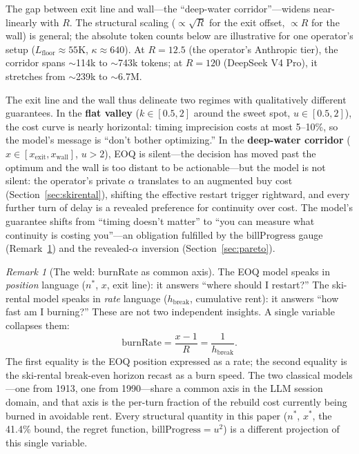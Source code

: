\documentclass[11pt]{article}
\theoremstyle{definition}
\theoremstyle{remark}
\newtheorem{remark}[theorem]{Remark}
\begin{document}
The gap between exit line and wall---the ``deep-water corridor''---widens near-linearly with $R$. The structural scaling ($\propto\sqrt{R}$ for the exit offset, $\propto R$ for the wall) is general; the absolute token counts below are illustrative for one operator's setup ($L_{\text{floor}} \approx 55$K, $\kappa \approx 640$). At $R = 12.5$ (the operator's Anthropic tier), the corridor spans $\sim$114k to $\sim$743k tokens; at $R = 120$ (DeepSeek V4 Pro), it stretches from $\sim$239k to $\sim$6.7M.

The exit line and the wall thus delineate two regimes with qualitatively different guarantees. In the \textbf{flat valley} ($k \in [0.5, 2]$ around the sweet spot, $u \in [0.5, 2]$), the cost curve is nearly horizontal: timing imprecision costs at most 5--10\%, so the model's message is ``don't bother optimizing.'' In the \textbf{deep-water corridor} ($x \in [x_{\text{exit}}, x_{\text{wall}}]$, $u > 2$), EOQ is silent---the decision has moved past the optimum and the wall is too distant to be actionable---but the model is not silent: the operator's private $\alpha$ translates to an augmented buy cost (Section~\ref{sec:skirental}), shifting the effective restart trigger rightward, and every further turn of delay is a revealed preference for continuity over cost. The model's guarantee shifts from ``timing doesn't matter'' to ``you can measure what continuity is costing you''---an obligation fulfilled by the $\text{billProgress}$ gauge (Remark~\ref{rem:weld}) and the revealed-$\alpha$ inversion (Section~\ref{sec:pareto}).

\begin{remark}[The weld: burnRate as common axis]
\label{rem:weld}
The EOQ model speaks in \emph{position} language ($n^*$, $x$, exit line): it answers ``where should I restart?'' The ski-rental model speaks in \emph{rate} language ($h_{\text{break}}$, cumulative rent): it answers ``how fast am I burning?'' These are not two independent insights. A single variable collapses them:
\[
\text{burnRate} = \frac{x-1}{R} = \frac{1}{h_{\text{break}}}.
\]
The first equality is the EOQ position expressed as a rate; the second equality is the ski-rental break-even horizon recast as a burn speed. The two classical models---one from 1913, one from 1990---share a common axis in the LLM session domain, and that axis is the per-turn fraction of the rebuild cost currently being burned in avoidable rent. Every structural quantity in this paper ($n^*$, $x^*$, the 41.4\% bound, the regret function, $\text{billProgress} = u^2$) is a different projection of this single variable.
\end{remark}
\end{document}
